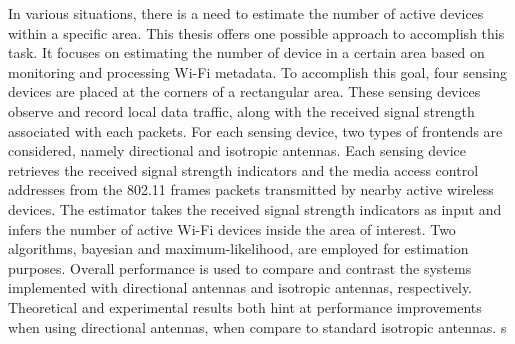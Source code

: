 \TAMUAbstractFormat

In various situations, there is a need to estimate the number of active devices within a specific area.
This thesis offers one possible approach to accomplish this task.
It focuses on estimating the number of device in a certain area based on monitoring and processing Wi-Fi metadata.
To accomplish this goal, four sensing devices are placed at the corners of a rectangular area.
These sensing devices observe and record local data traffic, along with the received signal strength associated with each packets.
For each sensing device, two types of frontends are considered, namely directional and isotropic antennas.
Each sensing device retrieves the received signal strength indicators and the media access control addresses from the 802.11 frames packets transmitted by nearby active wireless devices.
The estimator takes the received signal strength indicators as input and infers the number of active Wi-Fi devices inside the area of interest.
Two algorithms, bayesian and maximum-likelihood, are employed for estimation purposes.
Overall performance is used to compare and contrast the systems implemented with directional antennas and isotropic antennas, respectively.
Theoretical and experimental results both hint at performance improvements when using directional antennas, when compare to standard isotropic antennas.
s